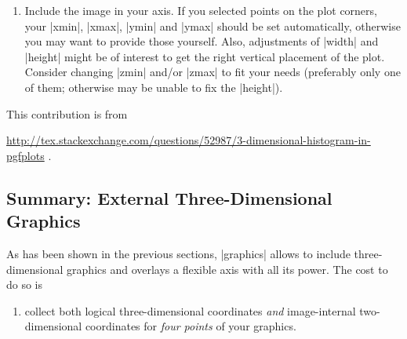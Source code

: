 {{\begin{enumerate}
        \emph{If} you really want to use |pdf| output of Matlab, you may need
        to set the paper size to match the figure size by yourself, since the
        PDF driver does not automatically adjust the size:
\begin{codeexample}
currentScreenUnits=get(gcf,'Units')     %
currentPaperUnits=get(gcf,'PaperUnits') %
set(gcf,'Units',currentPaperUnits)      %
plotPosition=get(gcf,'Position')        %
set(gcf,'PaperSize',plotPosition(3:4))  %
set(gcf,'Units',currentScreenUnits)     %

print -dpdf matlabout      %
\end{codeexample}
    \item Include the image in your \PGFPlots{} axis. If you selected points
        on the plot corners, your |xmin|, |xmax|, |ymin| and |ymax| should be
        set automatically, otherwise you may want to provide those yourself.
        Also, adjustments of |width| and |height| might be of interest to get
        the right vertical placement of the plot. Consider changing |zmin|
        and/or |zmax| to fit your needs (preferably only one of them;
        otherwise \PGFPlots{} may be unable to fix the |height|).
\end{enumerate}

This contribution is from

\noindent
\url{http://tex.stackexchange.com/questions/52987/3-dimensional-histogram-in-pgfplots} .


\subsection*{Summary: External Three-Dimensional Graphics}

As has been shown in the previous sections,  |graphics|
allows to include three-dimensional graphics and \PGFPlots{} overlays a
flexible axis with all its power. The cost to do so is
%
\begin{enumerate}
    \item collect both logical three-dimensional coordinates \emph{and}
        image-internal two-dimensional coordinates for \emph{four points} of
        your graphics.


\end{enumerate}}}
